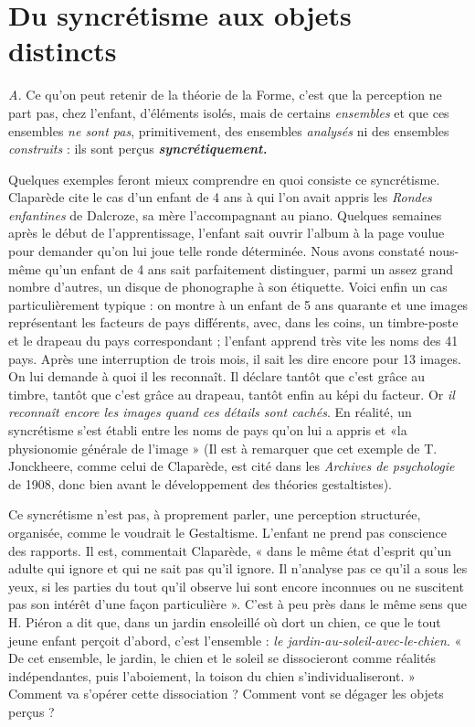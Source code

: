 \section{Du syncrétisme aux objets distincts}%
{\it A.} Ce qu’on peut
retenir de la théorie de la Forme, c’est que la perception ne part pas,
chez l’enfant, d'éléments isolés, mais de certains {\it ensembles} et que ces
ensembles {\it ne sont pas}, primitivement, des ensembles {\it analysés} ni des
ensembles {\it construits} : ils sont perçus \textbf{\textit {syncrétiquement.}}

\vspace{0.24cm}
{\footnotesize 
Quelques exemples feront mieux comprendre en quoi consiste ce syncrétisme.
Claparède cite le cas d’un enfant de 4 ans à qui l’on avait appris
les {\it Rondes enfantines} de Dalcroze, sa mère l’accompagnant au piano.
Quelques semaines après le début de l'apprentissage, l'enfant sait ouvrir
l’album à la page voulue pour demander qu'on lui joue telle ronde déterminée.
Nous avons constaté nous-même qu’un enfant de 4 ans sait parfaitement
distinguer, parmi un assez grand nombre d’autres, un disque de
phonographe à son étiquette. Voici enfin un cas particulièrement typique :
on montre à un enfant de 5 ans quarante et une images représentant les
facteurs de pays différents, avec, dans les coins, un timbre-poste et le
drapeau du pays correspondant ; l’enfant apprend très vite les noms des
41 pays. Après une interruption de trois mois, il sait les dire encore pour
13 images. On lui demande à quoi il les reconnaît. Il déclare tantôt que
c’est grâce au timbre, tantôt que c’est grâce au drapeau, tantôt enfin au
képi du facteur. Or {\it il reconnaît encore les images quand ces détails sont
cachés}. En réalité, un syncrétisme s’est établi entre les noms de pays qu’on
lui a appris et «la physionomie générale de l’image »
{\scriptsize (Il est à remarquer que cet exemple de T. Jonckheere, comme celui de Claparède,
est cité dans les {\it Archives de psychologie} de 1908, donc bien avant le développement des
théories gestaltistes)}.}
\vspace{0.31cm}

Ce syncrétisme n’est pas, à proprement parler, une perception
structurée, organisée, comme le voudrait le Gestaltisme. L’enfant ne
prend pas conscience des rapports. Il est, commentait Claparède,
« dans le même état d’esprit qu’un adulte qui ignore et qui ne sait pas
qu’il ignore. Il n'analyse pas ce qu’il a sous les yeux, si les parties
du tout qu'il observe lui sont encore inconnues ou ne suscitent pas
son intérêt d'une façon particulière ». C’est à peu près dans le même
sens que H. Piéron a dit que, dans un jardin ensoleillé où dort un
chien, ce que le tout jeune enfant perçoit d’abord, c’est l’ensemble :
{\it le jardin-au-soleil-avec-le-chien}. « De cet ensemble, le jardin, le
chien et le soleil se dissocieront comme réalités indépendantes,
puis l’aboiement, la toison du chien s’individualiseront. » Comment
va s’opérer cette dissociation ? Comment vont se dégager les objets
perçus ?

